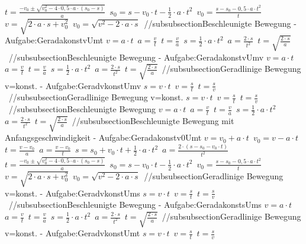 $ t = \frac{-v_{0}  \pm \sqrt{v_{0} ^{2} -4\cdot 0,5\cdot a\cdot (s_{0}  -s)}}{       a} $\ 
$ s_{0}  = s - v_{0} \cdot t - \frac{1}{2}\cdot a\cdot t^{2} $\ 
$ v_{0}  =\frac{s-s_{0} -0,5\cdot a\cdot t^{2} }{    t} $\ 
$ v  =\sqrt{2\cdot a \cdot s+ v_{0}^2} $\ 
$ v_{0}  =\sqrt{v^2-2\cdot a \cdot s} $\ 
//subsubsection{Beschleunigte Bewegung - Aufgabe:GeradakonstvUmt} 
$ v = a\cdot t $\ 
$ a = \frac{v}{t} $\ 
$ t = \frac{v}{a} $\ 
$ s = \frac{1}{2}\cdot a\cdot t^{2} $\ 
$ a = \frac{2\cdot s}{t^{2} } $\ 
$ t = \sqrt{\frac{2\cdot s}{a}} $\ 
//subsubsection{Beschleunigte Bewegung - Aufgabe:GeradakonstvUmv} 
$ v = a\cdot t $\ 
$ a = \frac{v}{t} $\ 
$ t = \frac{v}{a} $\ 
$ s = \frac{1}{2}\cdot a\cdot t^{2} $\ 
$ a = \frac{2\cdot s}{t^{2} } $\ 
$ t = \sqrt{\frac{2\cdot s}{a}} $\ 
//subsubsection{Geradlinige Bewegung v=konst. - Aufgabe:GeradvkonstUmv} 
$ s = v\cdot t $\ 
$ v = \frac{s}{t} $\ 
$ t = \frac{s}{v} $\ 
//subsubsection{Geradlinige Bewegung v=konst.} 
$ s = v\cdot t $\ 
$ v = \frac{s}{t} $\ 
$ t = \frac{s}{v} $\ 
//subsubsection{Beschleunigte Bewegung} 
$ v = a\cdot t $\ 
$ a = \frac{v}{t} $\ 
$ t = \frac{v}{a} $\ 
$ s = \frac{1}{2}\cdot a\cdot t^{2} $\ 
$ a = \frac{2\cdot s}{t^{2} } $\ 
$ t = \sqrt{\frac{2\cdot s}{a}} $\ 
//subsubsection{Beschleunigte Bewegung mit Anfangsgeschwindigkeit - Aufgabe:Geradakonstv0Umt} 
$ v = v_{0}  + a\cdot t $\ 
$ v_{0}  = v - a\cdot t $\ 
$ t = \frac{v - v_{0} }{a} $\ 
$ a = \frac{v - v_{0} }{  t} $\ 
$ s = s_{0}  + v_{0} \cdot t + \frac{1}{2}\cdot a\cdot t^{2} $\ 
$ a = \frac{2\cdot (s - s_{0}  - v_{0} \cdot t)}{     t^{2} } $\ 
$ t = \frac{-v_{0}  \pm \sqrt{v_{0} ^{2} -4\cdot 0,5\cdot a\cdot (s_{0}  -s)}}{       a} $\ 
$ s_{0}  = s - v_{0} \cdot t - \frac{1}{2}\cdot a\cdot t^{2} $\ 
$ v_{0}  =\frac{s-s_{0} -0,5\cdot a\cdot t^{2} }{    t} $\ 
$ v  =\sqrt{2\cdot a \cdot s+ v_{0}^2} $\ 
$ v_{0}  =\sqrt{v^2-2\cdot a \cdot s} $\ 
//subsubsection{Geradlinige Bewegung v=konst. - Aufgabe:GeradvkonstUms} 
$ s = v\cdot t $\ 
$ v = \frac{s}{t} $\ 
$ t = \frac{s}{v} $\ 
//subsubsection{Beschleunigte Bewegung - Aufgabe:GeradakonstsUms} 
$ v = a\cdot t $\ 
$ a = \frac{v}{t} $\ 
$ t = \frac{v}{a} $\ 
$ s = \frac{1}{2}\cdot a\cdot t^{2} $\ 
$ a = \frac{2\cdot s}{t^{2} } $\ 
$ t = \sqrt{\frac{2\cdot s}{a}} $\ 
//subsubsection{Geradlinige Bewegung v=konst. - Aufgabe:GeradvkonstUmt} 
$ s = v\cdot t $\ 
$ v = \frac{s}{t} $\ 
$ t = \frac{s}{v} $\ 

